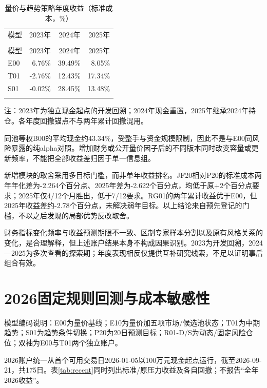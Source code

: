 \documentclass[12pt]{article}
\newcommand{\toprule}{\noalign{\hrule height .8pt}}
\newcommand{\midrule}{\noalign{\hrule height .4pt}}
\newcommand{\bottomrule}{\noalign{\hrule height .8pt}}
\begin{document}
{\small
\begin{longtable}{@{}lrrr@{}}
\caption{量价与趋势策略年度收益（标准成本，\%）}\label{tab:annual}\\
\toprule
模型 & 2023年 & 2024年 & 2025年 \\
\midrule\endfirsthead
\multicolumn{4}{c}{表\thetable（续）}\\\toprule
模型 & 2023年 & 2024年 & 2025年 \\
\midrule\endhead
E00 & 6.76\% & 39.49\% & 8.05\% \\
T01 & -2.76\% & 12.43\% & 17.34\% \\
S01 & -0.02\% & 28.45\% & 13.48\% \\
\bottomrule\end{longtable}}
{\footnotesize\noindent 注：2023年为独立现金起点的开发回溯；2024年现金重置，2025年继承2024年持仓。各年度回撤锚点不与两年累计回撤混用。\par}
同池等权B00的平均现金约43.34\%，受整手与资金规模限制，因此不是与E00同风险暴露的纯alpha对照。增加财务或公开量价因子后的不同版本同时改变容量或更新频率，不能把全部收益差归因于单一信息组。

新增模块的取舍采用多目标门槛，而非单年收益排名。JF20相对P20的标准成本两年年化差为-2.264个百分点、2025年差为-2.622个百分点，均低于原+2个百分点要求；2025年仅4/12个月胜出，低于7/12要求。RG01的两年累计收益优于E00，但2025年收益差约-2.78个百分点，未解决弱年目标。以上结论来自预先登记的门槛，不以之后发现的局部优势反改取舍。

财务指标变化频率与收益预测期限不一致、区制专家样本分割以及原有风格关系的变化，是合理解释，但上述账户结果本身不构成因果识别。2023为开发回溯，2024—2025为多次查看的探索期；年度表现相反仅提供互补研究线索，不足以证明事后组合有效。


\section{2026固定规则回测与成本敏感性}
模型编码说明：E00为量价基线；E10为量价加五项市场/候选池状态；T01为中期趋势；S01为趋势条件切换；P20为20日预测目标；R01-D/S为动态/固定风险仓位；双袖为E00与T01两个独立账户。

2026账户统一从首个可用交易日2026-01-05以100万元现金起点运行，截至2026-09-21，共175日。表\ref{tab:recent}同时列出标准/原压力收益及各自回撤；不报告“全年2026收益”。
\end{document}

